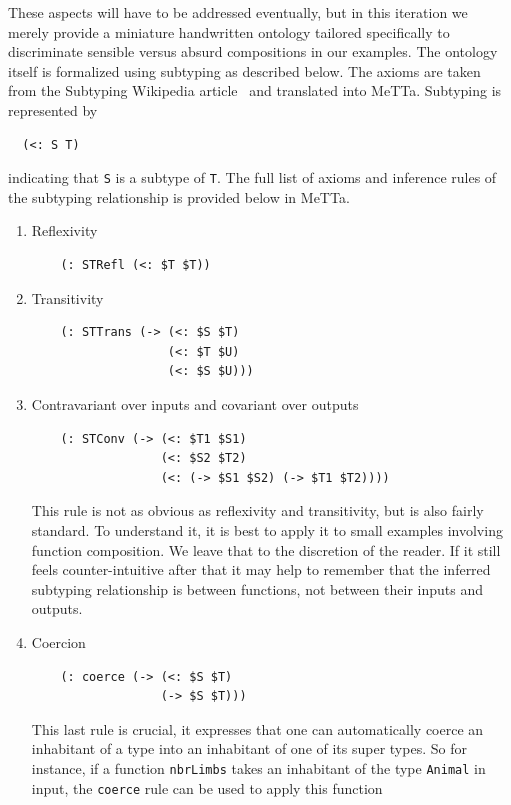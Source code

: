 \documentclass[]{report}
\begin{document}
These aspects will have to be addressed eventually, but in this
iteration we merely provide a miniature handwritten ontology tailored
specifically to discriminate sensible versus absurd compositions in
our examples.  The ontology itself is formalized using subtyping as
described below.  The axioms are taken from the Subtyping Wikipedia
article~\cite{enwiki:1292323950} and translated into MeTTa.  Subtyping
is represented by
\begin{verbatim}
  (<: S T)
\end{verbatim}
indicating that \texttt{S} is a subtype of
\texttt{T}.  The full list of axioms and inference rules
of the subtyping relationship is provided below in MeTTa.
\begin{enumerate}
\item Reflexivity
  \begin{verbatim}
    (: STRefl (<: $T $T))
  \end{verbatim}
\item Transitivity
  \begin{verbatim}
    (: STTrans (-> (<: $S $T)
                   (<: $T $U)
                   (<: $S $U)))
  \end{verbatim}
\item Contravariant over inputs and covariant over outputs
  \begin{verbatim}
    (: STConv (-> (<: $T1 $S1)
                  (<: $S2 $T2)
                  (<: (-> $S1 $S2) (-> $T1 $T2))))
  \end{verbatim}
  This rule is not as obvious as reflexivity and transitivity, but is
  also fairly standard.  To understand it, it is best to apply it to
  small examples involving function composition.  We leave that to the
  discretion of the reader.  If it still feels counter-intuitive after
  that it may help to remember that the inferred subtyping
  relationship is between functions, not between their inputs and
  outputs.
\item Coercion
  \begin{verbatim}
    (: coerce (-> (<: $S $T)
                  (-> $S $T)))
  \end{verbatim}
  This last rule is crucial, it expresses that one can automatically
  coerce an inhabitant of a type into an inhabitant of one of its
  super types.  So for instance, if a function
  \texttt{nbrLimbs} takes an inhabitant of the type
  \texttt{Animal} in input, the
  \texttt{coerce} rule can be used to apply this function

\end{enumerate}
\end{document}
